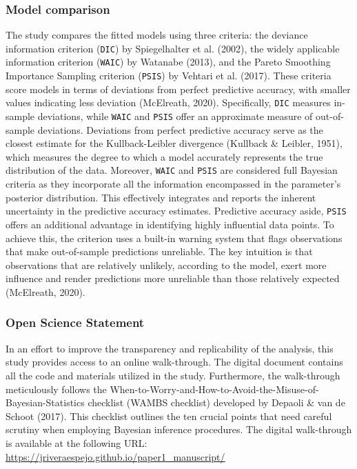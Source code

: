 \documentclass[
]{agujournal2019}
\begin{document}
\subsubsection{Model comparison}\label{sec-M-SM-MC}

The study compares the fitted models using three criteria: the deviance
information criterion (\texttt{DIC}) by Spiegelhalter et al. (2002), the
widely applicable information criterion (\texttt{WAIC}) by Watanabe
(2013), and the Pareto Smoothing Importance Sampling criterion
(\texttt{PSIS}) by Vehtari et al. (2017). These criteria score models in
terms of deviations from perfect predictive accuracy, with smaller
values indicating less deviation (McElreath, 2020). Specifically,
\texttt{DIC} measures in-sample deviations, while \texttt{WAIC} and
\texttt{PSIS} offer an approximate measure of out-of-sample deviations.
Deviations from perfect predictive accuracy serve as the closest
estimate for the Kullback-Leibler divergence (Kullback \& Leibler,
1951), which measures the degree to which a model accurately represents
the true distribution of the data. Moreover, \texttt{WAIC} and
\texttt{PSIS} are considered full Bayesian criteria as they incorporate
all the information encompassed in the parameter's posterior
distribution. This effectively integrates and reports the inherent
uncertainty in the predictive accuracy estimates. Predictive accuracy
aside, \texttt{PSIS} offers an additional advantage in identifying
highly influential data points. To achieve this, the criterion uses a
built-in warning system that flags observations that make out-of-sample
predictions unreliable. The key intuition is that observations that are
relatively unlikely, according to the model, exert more influence and
render predictions more unreliable than those relatively expected
(McElreath, 2020).

\subsubsection{Open Science Statement}\label{sec-M-SM-OS}

In an effort to improve the transparency and replicability of the
analysis, this study provides access to an online walk-through. The
digital document contains all the code and materials utilized in the
study. Furthermore, the walk-through meticulously follows the
When-to-Worry-and-How-to-Avoid-the-Misuse-of-Bayesian-Statistics
checklist (WAMBS checklist) developed by Depaoli \& van de Schoot
(2017). This checklist outlines the ten crucial points that need careful
scrutiny when employing Bayesian inference procedures. The digital
walk-through is available at the following URL:
\url{https://jriveraespejo.github.io/paper1_manuscript/}
\end{document}
